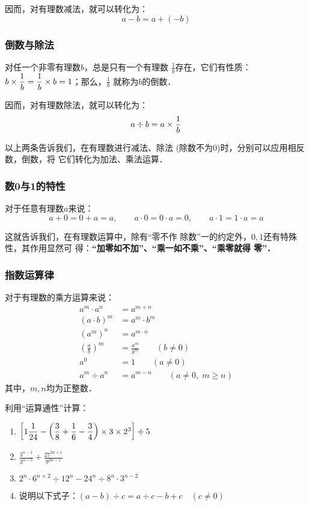 因而，对有理数减法，就可以转化为：
\[a-b=a+(-b)\]

\subsubsection{倒数与除法}
\begin{blk}{}
	对任一个非零有理数$b$，总是只有一个有理数
	$\frac{1}{b}$存在，它们有性质：$b\times\dfrac{1}{b}= \dfrac{1}{b} \times b=1$；那么，$\frac{1}{b}$
	就称为$b$的倒数．
\end{blk}

因而，对有理数除法，就可以转化为：
\[a\div b=a\times\dfrac{1}{b}\]

以上两条告诉我们，在有理数进行减法、除法
(除数不为0)时，分别可以应用相反数，倒数，将
它们转化为加法、乘法运算．

\subsubsection{数0与1的特性}
\begin{blk}{}
	对于任意有理数$a$来说：
	\[a+0=0+a=a,\qquad  a\cdot 0=0\cdot a=0,\qquad a\cdot 1=1\cdot a=a\]
\end{blk}

这就告诉我们，在有理数运算中，除有“零不作
除数”一的约定外，$0,  1$还有特殊性，其作用显然可
得：\textbf{“加零如不加”、“乘一如不乘”、“乘零就得
	零”．}

\subsubsection{指数运算律}
\begin{blk}{}
	对于有理数的乘方运算来说：
	\[\begin{split}
	a^m\cdot a^n&=a^{m+n}\\
	(a\cdot b)^m&=a^{m}\cdot b^m\\
	(a^m)^n&=a^{m\cdot n}\\
	\left(\frac{a}{b}\right)^m&=\frac{a^m}{b^m}\qquad (b\ne 0)\\
	a^0&=1\qquad (a\ne 0)\\
	a^m\div a^n&=a^{m-n} \qquad (a\ne 0,\; m\ge n)
	\end{split}\]
	其中，$m, n$均为正整数．
\end{blk}

\begin{ex}
	利用“运算通性”计算：
	\begin{enumerate}
		\item $\left[1\dfrac{1}{24}-\left(\dfrac{3}{8}+\dfrac{1}{6}-\dfrac{3}{4}\right)\times3\times2^3\right]\div 5$
		\item $\frac{3^{n-1}}{3^{n-5}}+\frac{27^{2n+1}}{9^{3n-1}}$
		\item $2^n\cdot 6^{n+2}\div 12^n-24^n\div 8^n\cdot 3^{n-2}$
		\item 说明以下式子：$(a-b)\div c=a\div c-b+c\quad (c\ne 0)$
	\end{enumerate}
	
\end{ex}

